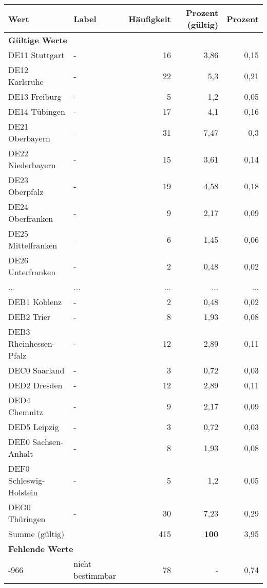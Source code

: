      \begin{longtable}{Xlrrr}
     \toprule
     \textbf{Wert} & \textbf{Label} & \textbf{Häufigkeit} & \textbf{Prozent (gültig)} & \textbf{Prozent} \\
     \endhead
     \midrule
     \multicolumn{5}{l}{\textbf{Gültige Werte}}\\
        \multicolumn{1}{X}{DE11 Stuttgart} & - & 16 & 3,86 & 0,15 \\
        \multicolumn{1}{X}{DE12 Karlsruhe} & - & 22 & 5,3 & 0,21 \\
        \multicolumn{1}{X}{DE13 Freiburg} & - & 5 & 1,2 & 0,05 \\
        \multicolumn{1}{X}{DE14 Tübingen} & - & 17 & 4,1 & 0,16 \\
        \multicolumn{1}{X}{DE21 Oberbayern} & - & 31 & 7,47 & 0,3 \\
        \multicolumn{1}{X}{DE22 Niederbayern} & - & 15 & 3,61 & 0,14 \\
        \multicolumn{1}{X}{DE23 Oberpfalz} & - & 19 & 4,58 & 0,18 \\
        \multicolumn{1}{X}{DE24 Oberfranken} & - & 9 & 2,17 & 0,09 \\
        \multicolumn{1}{X}{DE25 Mittelfranken} & - & 6 & 1,45 & 0,06 \\
        \multicolumn{1}{X}{DE26 Unterfranken} & - & 2 & 0,48 & 0,02 \\
       ... & ... & ... & ... & ... \\
        \multicolumn{1}{X}{DEB1 Koblenz} & - & 2 & 0,48 & 0,02 \\
        \multicolumn{1}{X}{DEB2 Trier} & - & 8 & 1,93 & 0,08 \\
        \multicolumn{1}{X}{DEB3 Rheinhessen-Pfalz} & - & 12 & 2,89 & 0,11 \\
        \multicolumn{1}{X}{DEC0 Saarland} & - & 3 & 0,72 & 0,03 \\
        \multicolumn{1}{X}{DED2 Dresden} & - & 12 & 2,89 & 0,11 \\
        \multicolumn{1}{X}{DED4 Chemnitz} & - & 9 & 2,17 & 0,09 \\
        \multicolumn{1}{X}{DED5 Leipzig} & - & 3 & 0,72 & 0,03 \\
        \multicolumn{1}{X}{DEE0 Sachsen-Anhalt} & - & 8 & 1,93 & 0,08 \\
        \multicolumn{1}{X}{DEF0 Schleswig-Holstein} & - & 5 & 1,2 & 0,05 \\
        \multicolumn{1}{X}{DEG0 Thüringen} & - & 30 & 7,23 & 0,29 \\
     \midrule
      \multicolumn{2}{l}{Summe (gültig)} & 415 &
      \textbf{100} &
         3,95 \\
     \multicolumn{5}{l}{\textbf{Fehlende Werte}}\\
       -966 & nicht bestimmbar & 78 & - & 0,74 \\


\end{longtable}
